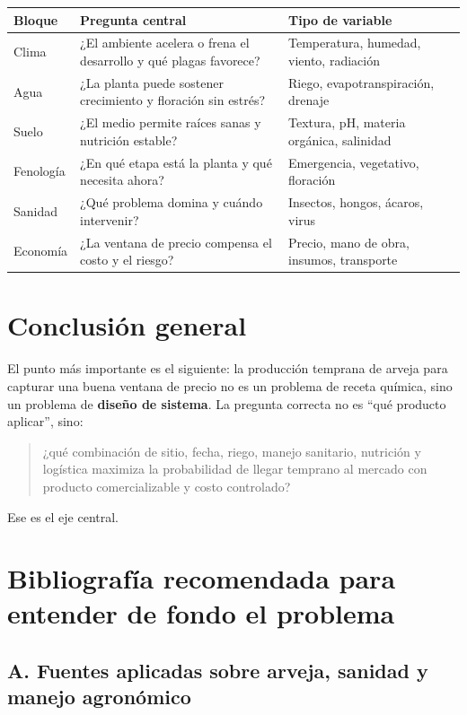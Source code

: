 \documentclass[11pt,a4paper]{article}
\begin{document}
\begin{center}
\renewcommand{\arraystretch}{1.25}
\begin{tabular}{p{3.2cm} p{5.6cm} p{4.8cm}}
\toprule
\textbf{Bloque} & \textbf{Pregunta central} & \textbf{Tipo de variable} \\
\midrule
Clima & ¿El ambiente acelera o frena el desarrollo y qué plagas favorece? & Temperatura, humedad, viento, radiación \\
Agua & ¿La planta puede sostener crecimiento y floración sin estrés? & Riego, evapotranspiración, drenaje \\
Suelo & ¿El medio permite raíces sanas y nutrición estable? & Textura, pH, materia orgánica, salinidad \\
Fenología & ¿En qué etapa está la planta y qué necesita ahora? & Emergencia, vegetativo, floración \\
Sanidad & ¿Qué problema domina y cuándo intervenir? & Insectos, hongos, ácaros, virus \\
Economía & ¿La ventana de precio compensa el costo y el riesgo? & Precio, mano de obra, insumos, transporte \\
\bottomrule
\end{tabular}
\end{center}

\section{Conclusión general}

El punto más importante es el siguiente: la producción temprana de arveja para capturar una buena ventana de precio no es un problema de receta química, sino un problema de \textbf{diseño de sistema}. La pregunta correcta no es \enquote{qué producto aplicar}, sino:

\begin{quote}
¿qué combinación de sitio, fecha, riego, manejo sanitario, nutrición y logística maximiza la probabilidad de llegar temprano al mercado con producto comercializable y costo controlado?
\end{quote}

Ese es el eje central.

\section{Bibliografía recomendada para entender de fondo el problema}

\subsection*{A. Fuentes aplicadas sobre arveja, sanidad y manejo agronómico}
\end{document}
